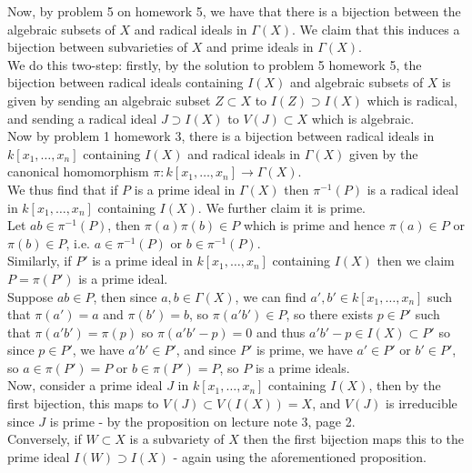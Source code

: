 \documentclass[a4paper]{article}
\begin{document}
Now, 
by problem 5 on homework 5, we have that there is a bijection between the
algebraic subsets of $X$ and radical ideals in $\Gamma(X)$. We claim that this
induces a bijection between subvarieties of $X$ and
prime ideals in $\Gamma(X)$.\\
We do this two-step: firstly, by the solution to problem 5 homework 5, 
the bijection between radical ideals containing $I(X)$ and algebraic subsets
of  $X$ is given by sending an algebraic subset  $Z \subset X$ to
$I(Z) \supset I(X)$ which is radical, and sending
a radical ideal $J \supset I(X) $ to $V(J) \subset X$ which is algebraic.\\
Now by problem 1 homework 3, there is a bijection between
radical ideals in $k\left[ x_1, \ldots, x_n \right] $ containing $I(X)$ and
radical ideals in $\Gamma(X)$ given by the canonical homomorphism
$\pi  \colon k\left[ x_1, \ldots, x_n \right] \to \Gamma(X)$.\\
We thus find that if $P$ is a prime ideal in $\Gamma(X)$ then
$\pi^{-1} (P)$ is a radical ideal in $k\left[ x_1, \ldots, x_n \right]
$ containing $I(X)$. We further claim it is prime.\\
Let $ab \in \pi^{-1}(P)$, then $\pi(a) \pi(b) \in P$ which is prime and hence
$\pi(a) \in P$ or $\pi(b) \in P$, i.e. $a \in \pi^{-1}(P)$ or $b\in
\pi^{-1}(P)$.\\
Similarly, if $P'$ is a prime ideal in $k\left[ x_1, \ldots, x_n
\right] $ containing $I(X)$ then we claim $P = \pi(P')$ is a prime ideal.\\
Suppose $ab \in P$, then since $a,b \in \Gamma(X)$, we can find
$a', b' \in k\left[ x_1, \ldots, x_n \right] $ such that
$\pi(a') = a$ and $\pi(b') = b$, so $\pi(a' b') \in P$, so there
exists $p \in P'$ such that $\pi(a'b') = \pi(p)$ so
$\pi(a'b' - p) = 0$ and thus
$a'b' - p \in I(X) \subset P'$ so since $p \in P'$, we have
$a'b' \in P'$, and since $P'$ is prime, we have $a' \in P'$ or $b' \in P'$, so
$a \in \pi(P') = P$ or $b \in \pi(P') = P$, so $P$ is a prime ideals.\\
\linebreak
Now, consider a prime ideal $J$ in $k\left[ x_1, \ldots, x_n \right] $ containing
$I(X)$, then
by the first bijection, this maps to
$V(J) \subset V\left( I\left( X \right)  \right) = X $, and $V(J)$ is
irreducible since $J$ is prime - by the proposition on lecture note 3, page
2.\\
Conversely, if $W \subset X$ is a subvariety of $X$ then
the first bijection maps this to the prime ideal
$I(W) \supset I(X)$ - again using the aforementioned proposition.\\
\end{document}
